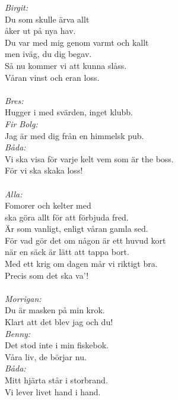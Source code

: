 \documentclass[a6paper, 10pt, twoside]{article}
\begin{document}
\begin{center}
\end{center}
\begin{lyrics}


\end{lyrics}
\textit{Birgit:} \\
Du som skulle ärva allt \\
åker ut på nya hav. \\
Du var med mig genom varmt och kallt \\
men iväg, du dig begav. \\
Så nu kommer vi att kunna slåss. \\
Våran vinst och eran loss. \\
\\
\textit{Bres:}\\
Hugger i med svärden, inget klubb.\\
\textit{Fir Bolg:}\\
Jag är med dig från en himmelsk pub.\\
\textit{Båda:}\\
Vi ska visa för varje kelt vem som är the boss. \\
För vi ska skaka loss! \\
\\
\textit{Alla:} \\
Fomorer och kelter med \\
ska göra allt för att förbjuda fred. \\
Är som vanligt, enligt våran gamla sed. \\
För vad gör det om någon är ett huvud kort \\
när en säck är lätt att tappa bort. \\
Med ett krig om dagen mår vi riktigt bra. \\
Precis som det ska va'! \\
\\
\textit{Morrigan:} \\
Du är masken på min krok. \\
Klart att det blev jag och du! \\
\textit{Benny:} \\
Det stod inte i min fiskebok. \\
Våra liv, de börjar nu. \\
\textit{Båda:} \\ 
Mitt hjärta står i storbrand. \\
Vi lever livet hand i hand. \\
\end{document}
